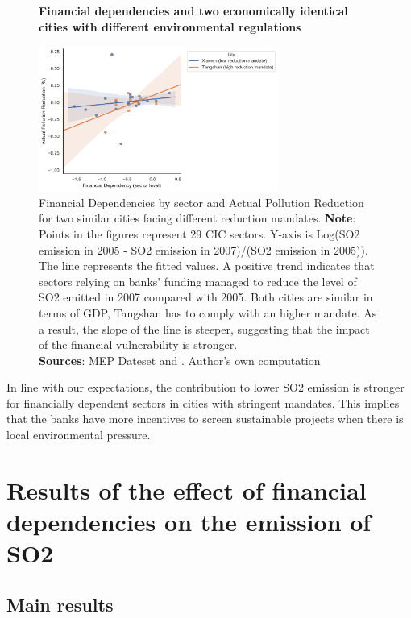 \documentclass[12pt]{article}
\begin{document}
\begin{figure}[ht]
    \centering
    \textbf{Financial dependencies and two economically identical cities with different environmental regulations}\par\medskip
    \includegraphics[width=0.7\textwidth]{fig_4}
    \caption{Financial Dependencies by sector and Actual Pollution Reduction for two similar cities facing different reduction mandates.
    \textbf{Note}: Points in the figures represent 29 CIC sectors. Y-axis is Log(SO2 emission in 2005 - SO2 emission in 2007)/(SO2 emission in 2005)). The line represents the fitted values. A positive trend indicates that sectors relying on banks’ funding managed to reduce the level of SO2 emitted in 2007 compared with 2005. Both cities are similar in terms of GDP, Tangshan has to comply with an higher mandate. As a result, the slope of the line is steeper, suggesting that the impact of the financial vulnerability is stronger.\\
    \textbf{Sources}: MEP Dateset and \cite{Fan2015-bm}. Author's own computation
    }
    \label{fig:figure4}
\end{figure}

In line with our expectations, the contribution to lower SO2 emission is stronger for financially dependent sectors in cities with stringent mandates. This implies that the banks have more incentives to screen sustainable projects when there is local environmental pressure.

\section{Results of the effect of financial dependencies on the emission of SO2} \label{sec:result}

\subsection{Main results}
\end{document}
